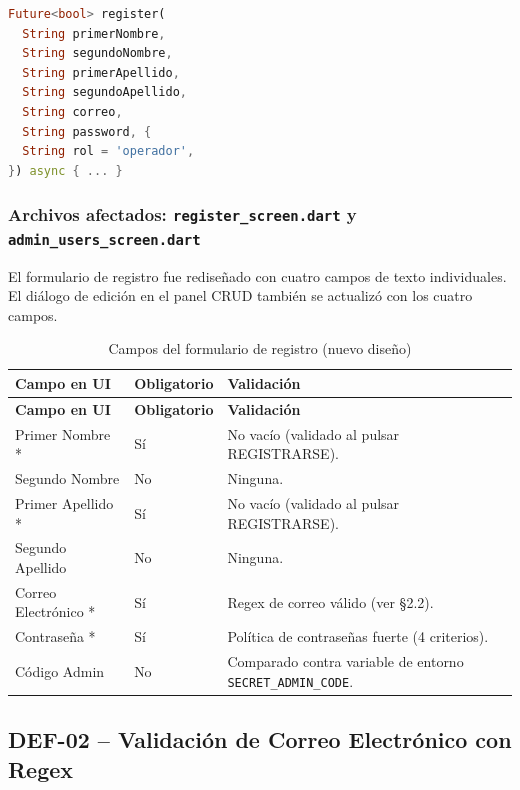\documentclass[12pt,a4paper]{article}
\begin{document}
\begin{lstlisting}[language=Dart, caption={Nueva firma de AuthController.register()}]
Future<bool> register(
  String primerNombre,
  String segundoNombre,
  String primerApellido,
  String segundoApellido,
  String correo,
  String password, {
  String rol = 'operador',
}) async { ... }
\end{lstlisting}

\subsubsection{Archivos afectados: \texttt{register\_screen.dart} y \texttt{admin\_users\_screen.dart}}

El formulario de registro fue rediseñado con cuatro campos de texto individuales.
El diálogo de edición en el panel CRUD también se actualizó con los cuatro campos.

\begin{longtable}{p{5cm} p{3cm} p{5.5cm}}
\caption{Campos del formulario de registro (nuevo diseño)} \label{tab:form-registro} \\
\toprule
\textbf{Campo en UI} & \textbf{Obligatorio} & \textbf{Validación} \\
\midrule
\endfirsthead
\toprule
\textbf{Campo en UI} & \textbf{Obligatorio} & \textbf{Validación} \\
\midrule
\endhead
\bottomrule
\endlastfoot
Primer Nombre *    & Sí & No vacío (validado al pulsar REGISTRARSE). \\
Segundo Nombre     & No & Ninguna. \\
Primer Apellido *  & Sí & No vacío (validado al pulsar REGISTRARSE). \\
Segundo Apellido   & No & Ninguna. \\
Correo Electrónico *& Sí & Regex de correo válido (ver §2.2). \\
Contraseña *       & Sí & Política de contraseñas fuerte (4 criterios). \\
Código Admin       & No & Comparado contra variable de entorno \texttt{SECRET\_ADMIN\_CODE}. \\
\end{longtable}

\subsection{DEF-02 -- Validación de Correo Electrónico con Regex}
\end{document}
